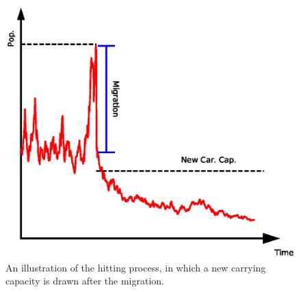 \documentclass[11pt]{article}
\begin{document}
\begin{figure}[!htbp]
\begin{center}
\includegraphics[width=\textwidth]{AncillaryFiles//figure25.eps}
\caption{An illustration of the hitting process, in which a new carrying capacity is drawn after the migration. } \label{evo0}
\end{center} 
\end{figure}
\end{document}
